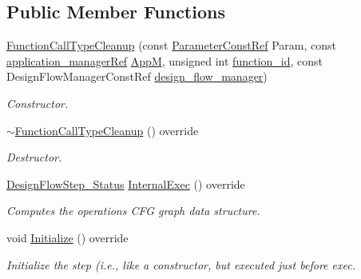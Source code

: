 \subsection*{Public Member Functions}
\begin{DoxyCompactItemize}
\item 
\hyperlink{classFunctionCallTypeCleanup_a56e30cd0c90323c204d86cd4246358b5}{Function\+Call\+Type\+Cleanup} (const \hyperlink{Parameter_8hpp_a37841774a6fcb479b597fdf8955eb4ea}{Parameter\+Const\+Ref} Param, const \hyperlink{application__manager_8hpp_a04ccad4e5ee401e8934306672082c180}{application\+\_\+manager\+Ref} \hyperlink{classFrontendFlowStep_a0ac0d8db2a378416583f51c4faa59d15}{AppM}, unsigned int \hyperlink{classFunctionFrontendFlowStep_a58ef2383ad1a212a8d3f396625a4b616}{function\+\_\+id}, const Design\+Flow\+Manager\+Const\+Ref \hyperlink{classDesignFlowStep_ab770677ddf087613add30024e16a5554}{design\+\_\+flow\+\_\+manager})
\begin{DoxyCompactList}\small\item\em Constructor. \end{DoxyCompactList}\item 
\hyperlink{classFunctionCallTypeCleanup_af5b76386bf8f7a6b30862346a215aa6a}{$\sim$\+Function\+Call\+Type\+Cleanup} () override
\begin{DoxyCompactList}\small\item\em Destructor. \end{DoxyCompactList}\item 
\hyperlink{design__flow__step_8hpp_afb1f0d73069c26076b8d31dbc8ebecdf}{Design\+Flow\+Step\+\_\+\+Status} \hyperlink{classFunctionCallTypeCleanup_a2e3a025dd337bafdd96b26071ab18e69}{Internal\+Exec} () override
\begin{DoxyCompactList}\small\item\em Computes the operations C\+FG graph data structure. \end{DoxyCompactList}\item 
void \hyperlink{classFunctionCallTypeCleanup_ab3d6a5c58f07a1c7c8bb7af316aee7c3}{Initialize} () override
\begin{DoxyCompactList}\small\item\em Initialize the step (i.\+e., like a constructor, but executed just before exec. \end{DoxyCompactList}\end{DoxyCompactItemize}
